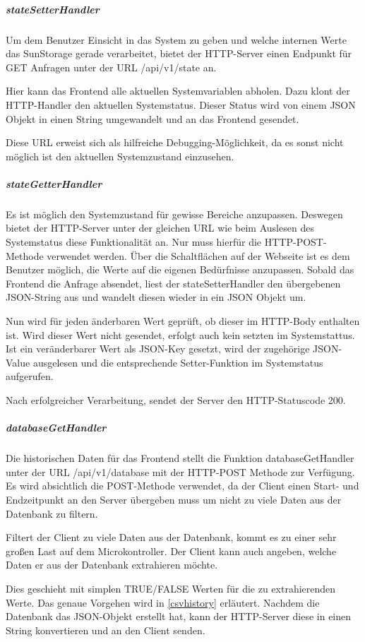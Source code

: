 \subparagraph{stateSetterHandler} Um dem Benutzer Einsicht in das System zu geben und welche internen Werte das SunStorage gerade verarbeitet, bietet der HTTP-Server einen Endpunkt für GET Anfragen unter der URL \glqq /api/v1/state\grqq{} an.

Hier kann das Frontend alle aktuellen Systemvariablen abholen. Dazu klont der HTTP-Handler den aktuellen Systemstatus. Dieser Status wird von einem JSON Objekt in einen String umgewandelt und an das Frontend gesendet.

Diese URL erweist sich als hilfreiche Debugging-Möglichkeit, da es sonst nicht möglich ist den aktuellen Systemzustand einzusehen.

\subparagraph{stateGetterHandler} Es ist möglich den Systemzustand für gewisse Bereiche anzupassen. Deswegen bietet der HTTP-Server unter der gleichen URL wie beim Auslesen des Systemstatus diese Funktionalität an. Nur muss hierfür die HTTP-POST-Methode verwendet werden.
Über die Schaltflächen auf der Webseite ist es dem Benutzer möglich, die Werte auf die eigenen Bedürfnisse anzupassen. Sobald das Frontend die Anfrage absendet, liest der \glqq stateSetterHandler\grqq{} den übergebenen JSON-String aus und wandelt diesen wieder in ein JSON Objekt um.

Nun wird für jeden änderbaren Wert geprüft, ob dieser im HTTP-Body enthalten ist. Wird dieser Wert nicht gesendet, erfolgt auch kein setzten im Systemstattus.
Ist ein veränderbarer Wert als JSON-Key gesetzt, wird der zugehörige JSON-Value ausgelesen und die entsprechende Setter-Funktion im Systemstatus aufgerufen.

Nach erfolgreicher Verarbeitung, sendet der Server den HTTP-Statuscode 200.

\subparagraph{databaseGetHandler} Die historischen Daten für das Frontend stellt die Funktion databaseGetHandler unter der URL \glqq /api/v1/database\grqq{} mit der HTTP-POST Methode zur Verfügung. Es wird absichtlich die POST-Methode verwendet, da der Client einen Start- und Endzeitpunkt an den Server übergeben muss um nicht zu viele Daten aus der Datenbank zu filtern.

Filtert der Client zu viele Daten aus der Datenbank, kommt es zu einer sehr großen Last auf dem Microkontroller. Der Client kann auch angeben, welche Daten er aus der Datenbank extrahieren möchte.

Dies geschieht mit simplen TRUE/FALSE Werten für die zu extrahierenden Werte. Das genaue Vorgehen wird in \autoref{csvhistory} erläutert. Nachdem die Datenbank das JSON-Objekt erstellt hat, kann der HTTP-Server diese in einen String konvertieren und an den Client senden.

